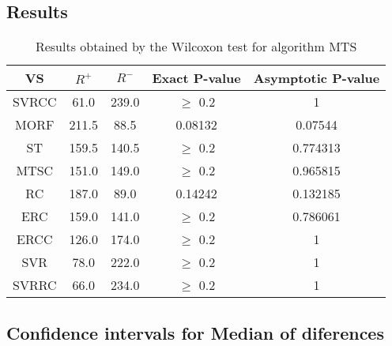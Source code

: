 \documentclass[a4paper,10pt]{article}
\begin{document}
\subsection{Results}

\begin{table}[!htp]
\centering\small
\begin{tabular}{
|c|c|c|c|c|}
\hline
 VS & $R^{+}$ & $R^{-}$ & Exact P-value & Asymptotic P-value \\ \hline 
SVRCC & 61.0 & 239.0 & $\geq$ 0.2 & 1\\ \hline 
MORF & 211.5 & 88.5 & 0.08132 & 0.07544\\ \hline 
ST & 159.5 & 140.5 & $\geq$ 0.2 & 0.774313\\ \hline 
MTSC & 151.0 & 149.0 & $\geq$ 0.2 & 0.965815\\ \hline 
RC & 187.0 & 89.0 & 0.14242 & 0.132185\\ \hline 
ERC & 159.0 & 141.0 & $\geq$ 0.2 & 0.786061\\ \hline 
ERCC & 126.0 & 174.0 & $\geq$ 0.2 & 1\\ \hline 
SVR & 78.0 & 222.0 & $\geq$ 0.2 & 1\\ \hline 
SVRRC & 66.0 & 234.0 & $\geq$ 0.2 & 1\\ \hline 

\end{tabular}
\caption{Results obtained by the Wilcoxon test for algorithm MTS}
\end{table}

\subsection{Confidence intervals for Median of diferences}
\end{document}
